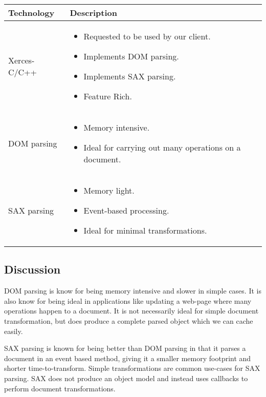 \begin{center}
  \begin{tabular}{ | l | p{10cm} | }
    \hline
    Technology & Description  \\ \hline
    Xerces-C/C++ \cite{xerces} &
    \begin{itemize}
      \item Requested to be used by our client.
      \item Implements DOM parsing.
      \item Implements SAX parsing.
      \item Feature Rich.
    \end{itemize}\\ \hline
    DOM parsing \cite{dom-vs-sax} &
    \begin{itemize}
      \item Memory intensive.
      \item Ideal for carrying out many operations on a document.
    \end{itemize}\\ \hline
    SAX parsing \cite{dom-vs-sax} &
    \begin{itemize}
      \item Memory light.
      \item Event-based processing.
      \item Ideal for minimal transformations.
    \end{itemize}\\ \hline
  \end{tabular}
\end{center}

\subsection{Discussion}

DOM parsing is know for being memory intensive and slower in simple cases.
It is also know for being ideal in applications like updating a web-page where many operations happen to a document.
It is not necessarily ideal for simple document transformation, but does produce a complete parsed object which we can cache easily.

SAX parsing is known for being better than DOM parsing in that it parses a document in an event based method, giving it a smaller memory footprint and shorter time-to-transform.
Simple transformations are common use-cases for SAX parsing.
SAX does not produce an object model and instead uses callbacks to perform document transformations.

